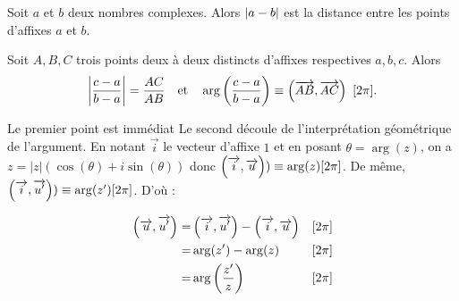 \documentclass{magnolia}
\begin{document}


\begin{proposition}[utile=-3]
Soit $a$ et $b$ deux nombres complexes. Alors $\left|a-b\right|$ est la distance entre les points d'affixes $a$ et $b$.
\end{proposition}

\begin{proposition}[utile=-3]
Soit $A,B,C$ trois points deux à deux distincts d'affixes respectives $a,b,c$. Alors
\[\left|\frac{c-a}{b-a}\right| = \frac{AC}{AB} \quad\text{et}\quad   \arg\left(\frac{c-a}{b-a}\right)\equiv\left(\overrightarrow{AB}, \overrightarrow{AC}\right)\  [2 \pi].\]
\end{proposition}

\begin{preuve}
Le premier point est immédiat Le second découle de l'interprétation géométrique de l'argument. En notant $\overrightarrow{i}$ le vecteur d'affixe $1$ et en posant $\theta=\arg(z)$, on a $z=|z|(\cos(\theta)+i\sin(\theta))$ donc $\left(\overrightarrow{i}, \overrightarrow{u}\right))\equiv \arg(z)[2\pi]$. De même, $\left(\overrightarrow{i}, \overrightarrow{u'}\right))\equiv \arg(z')[2\pi]$. D'où :


\begin{eqnarray*}
\left(\overrightarrow{u}, \overrightarrow{u'}\right)=& \left(\overrightarrow{i}, \overrightarrow{u'}\right)-\left(\overrightarrow{i}, \overrightarrow{u}\right)&[2\pi]\\
=&  \arg(z')-\arg(z)   &[2\pi]\\
=& \arg\left(\frac{z'}{z}\right) &[2\pi]
\end{eqnarray*}
\end{preuve}
\end{document}
